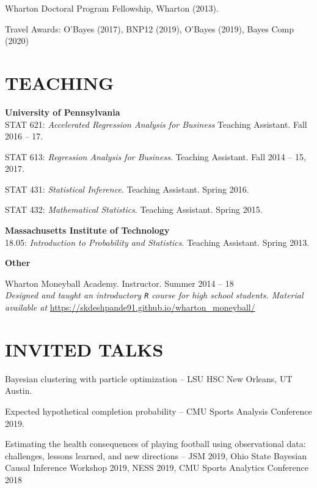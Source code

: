 \documentclass[margin]{res}
\begin{document}
\begin{resume}
Wharton Doctoral Program Fellowship, Wharton (2013).

Travel Awards: O'Bayes (2017), BNP12 (2019), O'Bayes (2019), Bayes Comp (2020)

\section{TEACHING}

\textbf{University of Pennsylvania} \\

STAT 621: {\it Accelerated Regression Analysis for Business} Teaching Assistant. Fall 2016 -- 17.

STAT 613: {\it Regression Analysis for Business}. Teaching Assistant. Fall 2014 -- 15, 2017.

STAT 431: {\it Statistical Inference}. Teaching Assistant. Spring 2016.

STAT 432: {\it Mathematical Statistics}. Teaching Assistant. Spring 2015.


\textbf{Massachusetts Institute of Technology} \\

18.05: {\it Introduction to Probability and Statistics}. Teaching Assistant. Spring 2013.

\textbf{Other}

Wharton Moneyball Academy. Instructor. Summer 2014 -- 18 \\
\textit{Designed and taught an introductory \texttt{R} course for high school students. Material available at}  \url{https://skdeshpande91.github.io/wharton_moneyball/}

\section{INVITED  \hspace{0.1in} TALKS}


Bayesian clustering with particle optimization -- LSU HSC New Orleans, UT Austin. 

Expected hypothetical completion probability -- CMU Sports Analysis Conference 2019.

Estimating the health consequences of playing football using observational data: challenges, lessons learned, and new directions -- JSM 2019, Ohio State Bayesian Causal Inference Workshop 2019, NESS 2019, CMU Sports Analytics Conference 2018



\end{resume}
\end{document}
